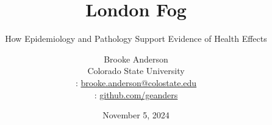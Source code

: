\usepackage{booktabs}
\usepackage{array}
\usepackage{colortbl}
\usepackage[british]{babel}
\usepackage{graphicx,hyperref,url}
\usepackage{fontawesome}
\usepackage{hyperref}
\usepackage{adjustbox}
\usepackage{appendixnumberbeamer}
\hypersetup{colorlinks=true,allcolors=blue}
\usepackage{xcolor}

\title{London Fog}
\subtitle{How Epidemiology and Pathology Support Evidence of Health Effects}
\date{November 5, 2024}

\author[Anderson]{
  Brooke Anderson\\ 
  Colorado State University \medskip \\ 
  {\small \faEnvelope: \url{brooke.anderson@colostate.edu}} \\
  {\small \faGithub:  \url{github.com/geanders}}
  }


